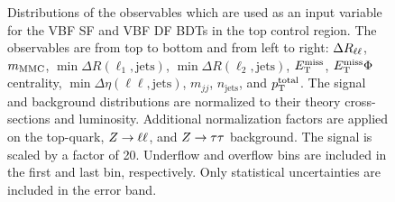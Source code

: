 \begin{figure}[htb]
\begin{subfigure}[t]{0.3\textwidth}
    \end{subfigure}
    \caption{Distributions of the observables which are used as an input variable for the VBF SF and VBF DF BDTs in the top control region.
             The observables are from top to bottom and from left to right: $\Delta R_{\ell\ell}$, $m_\text{MMC}$, $\min \Delta R (\ell_1, \text{jets})$, $\min \Delta R (\ell_2, \text{jets})$,
             $E_\text{T}^\text{miss}$, $E_\text{T}^\text{miss} \Phi$ centrality, $\min \Delta \eta (\ell\ell, \text{jets})$, $m_{jj}$, $n_\text{jets}$, and $p_\text{T}^\text{total}$.
             The signal and background distributions are normalized to their theory cross-sections and luminosity.
             Additional normalization factors are applied on the top-quark, $Z \to \ell \ell$, and $Z \to \tau \tau$ background.
             The signal is scaled by a factor of 20.
             Underflow and overflow bins are included in the first and last bin, respectively.
             Only statistical uncertainties are included in the error band.}\label{fig:mva:modeling:cr:vbftop}
\end{figure}

